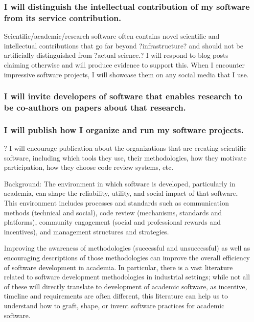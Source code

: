 \documentclass[a4paper,UKenglish]{dagman}
\renewcommand{\paragraph}[1]{\subsubsection*{#1}\xspace}
\begin{document}
\paragraph{I will distinguish the intellectual contribution of my software from its service contribution.}



Scientific/academic/research software often contains novel scientific and intellectual contributions that go far beyond ?infrastructure? and should not be artificially distinguished from ?actual science.? I will respond to blog posts claiming otherwise and will produce evidence to support this. When I encounter impressive software projects, I will showcase them on any social media that I use.

\paragraph{I will invite developers of software that enables research to be co-authors on papers about that research.}


\paragraph{I will publish how I organize and run my software projects.}

?	I will encourage publication about the organizations that are creating scientific software, including which tools they use, their methodologies, how they motivate participation, how they choose code review systems, etc.

Background: The environment in which software is developed, particularly in academia, can shape the reliability, utility, and social impact of that software.  This environment includes processes and standards such as communication methods (technical and social), code review (mechanisms, standards and platforms), community engagement (social and professional rewards and incentives), and management structures and strategies.

Improving the awareness of methodologies (successful and unsuccessful) as well as encouraging descriptions of those methodologies can improve the overall efficiency of software development in academia.  In particular, there is a vast literature related to software development methodologies in industrial settings; while not all of these will directly translate to development of academic software, as incentive, timeline and requirements are often different, this literature can help us to understand how to graft, shape, or invent software practices for academic software.
\end{document}
